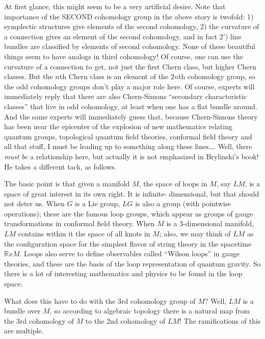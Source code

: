\documentclass{article}
\begin{document}
At first glance, this might seem to be a very artificial desire. Note
that importance of the SECOND cohomology group in the above story is
twofold: 1) symplectic structures give elements of the second
cohomology, 2) the curvature of a connection gives an element of the
second cohomology, and in fact 2') line bundles are classified by
elements of second cohomology. None of these beautiful things seem to
have analogs in third cohomology! Of course, one can use the curvature
of a connection to get, not just the first Chern class, but higher Chern
classes. But the \(n\)th Chern class is an element of the \(2n\)th
cohomology group, so the odd cohomology groups don't play a major role
here. Of course, experts will immediately reply that there are also
Chern-Simons ``secondary characteristic classes'' that live in odd
cohomology, at least when one has a flat bundle around. And the same
experts will immediately guess that, because Chern-Simons theory has
been near the epicenter of the explosion of new mathematics relating
quantum groups, topological quantum field theories, conformal field
theory and all that stuff, I must be leading up to something along these
lines\ldots. Well, there \emph{must be} a relationship here, but
actually it is not emphasized in Brylinski's book! He takes a different
tack, as follows.

The basic point is that given a manifold \(M\), the space of loops in
\(M\), say \(LM\), is a space of great interest in its own right. It is
infinite- dimensional, but that should not deter us. When \(G\) is a Lie
group, \(LG\) is also a group (with pointwise operations); these are the
famous loop groups, which appear as groups of gauge transformations in
conformal field theory. When \(M\) is a 3-dimensional manifold, \(LM\)
contains within it the space of all knots in \(M\); also, we may think
of \(LM\) as the configuration space for the simplest flavor of string
theory in the spacetime \(\mathbb{R} x M\). Loops also serve to define
observables called ``Wilson loops'' in gauge theories, and these are the
basis of the loop representation of quantum gravity. So there is a lot
of interesting mathematics and physics to be found in the loop space.

What does this have to do with the 3rd cohomology group of \(M\)? Well,
\(LM\) is a bundle over \(M\), so according to algebraic topology there
is a natural map from the 3rd cohomology of \(M\) to the 2nd cohomology
of \(LM\)! The ramifications of this are multiple.
\end{document}
